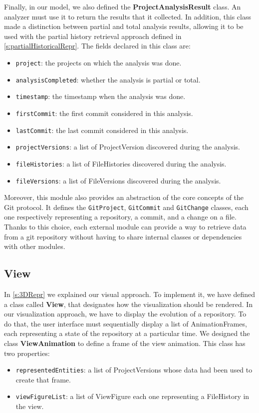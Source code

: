 Finally, in our model, we also defined the \textbf{ProjectAnalysisResult} class. An analyzer must use it to return the results that it collected. In addition, this class made a distinction between partial and total analysis results, allowing it to be used with the partial history retrieval approach defined in \autoref{s:partialHistoricalRepr}. The fields declared in this class are:
\begin{itemize}
    \item \texttt{project}: the projects on which the analysis was done.
    \item \texttt{analysisCompleted}: whether the analysis is partial or total.
    \item \texttt{timestamp}: the timestamp when the analysis was done. 
    \item \texttt{firstCommit}: the first commit considered in this analysis. 
    \item \texttt{lastCommit}: the last commit considered in this analysis. 
    \item \texttt{projectVersions}: a list of ProjectVersion discovered during the analysis.
    \item \texttt{fileHistories}: a list of FileHistories discovered during the analysis.
    \item \texttt{fileVersions}: a list of FileVersions discovered during the analysis.
\end{itemize}

Moreover, this module also provides an abstraction of the core concepts of the Git protocol. It defines the \texttt{GitProject}, \texttt{GitCommit} and \texttt{GitChange} classes, each one respectively representing a repository, a commit, and a change on a file. 
Thanks to this choice, each external module can provide a way to retrieve data from a git repository without having to share internal classes or dependencies with other modules. 


\subsection*{View}
\label{s:view_impl}
In \autoref{s:3DRepr} we explained our visual approach. To implement it, we have defined a class called \textbf{View}, that designates how the visualization should be rendered. 
In our visualization approach, we have to display the evolution of a repository. To do that, the user interface must sequentially display a list of AnimationFrames, each representing a state of the repository at a particular time. We designed the class \textbf{ViewAnimation} to define a frame of the view animation. This class has two properties:
\begin{itemize}
    \item \texttt{representedEntities}: a list of ProjectVersions whose data had been used to create that frame.
    \item \texttt{viewFigureList}: a list of ViewFigure each one representing a FileHistory in the view.
\end{itemize}


